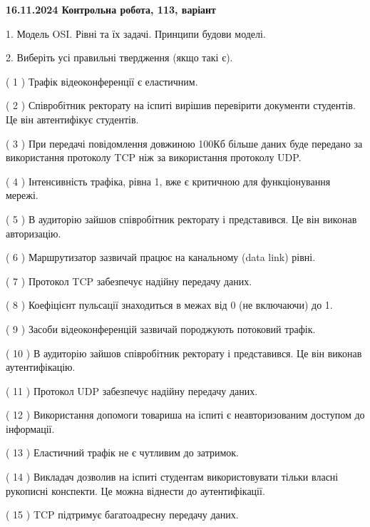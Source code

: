 \documentclass[12pt, ukrainian]{article}
\begin{document}
\vspace{4mm}
\newpage
\begin {large}

\textbf{16.11.2024 Контрольна робота, 113, варіант  }\par


{
1. Модель OSI. Рівні та їх задачі. Принципи будови моделі.



\vspace{5mm}
2. Виберіть усі правильні твердження (якщо такі є).\par
\vspace{2mm}

( 1 ) Трафік відеоконференції є еластичним.

( 2 ) Співробітник ректорату на іспиті вирішив перевірити документи студентів. Це він автентифікує студентів.

( 3 ) При передачі повідомлення довжиною 100Кб більше даних буде передано за використання протоколу TCP ніж за використання протоколу UDP.

( 4 ) Інтенсивність трафіка, рівна 1, вже є критичною для функціонування мережі.

( 5 ) В аудиторію зайшов співробітник ректорату і представився. Це він виконав авторизацію.

( 6 ) Маршрутизатор зазвичай працює на канальному (data link) рівні.

( 7 ) Протокол TCP забезпечує надійну передачу даних.

( 8 ) Коефіцієнт пульсації знаходиться в межах від 0 (не включаючи) до 1.

( 9 ) Засоби відеоконференцій зазвичай породжують потоковий трафік.

( 10 ) В аудиторію зайшов співробітник ректорату і представився. Це він виконав аутентифікацію.

( 11 ) Протокол UDP забезпечує надійну передачу даних.

( 12 ) Використання допомоги товариша на іспиті є неавторизованим доступом до інформації.

( 13 ) Еластичний трафік не є чутливим до затримок.

( 14 ) Викладач дозволив на іспиті студентам використовувати тільки власні рукописні конспекти. Це можна віднести до аутентифікації.

( 15 ) TCP підтримує багатоадресну передачу даних.
}
\end {large}
\end{document}
